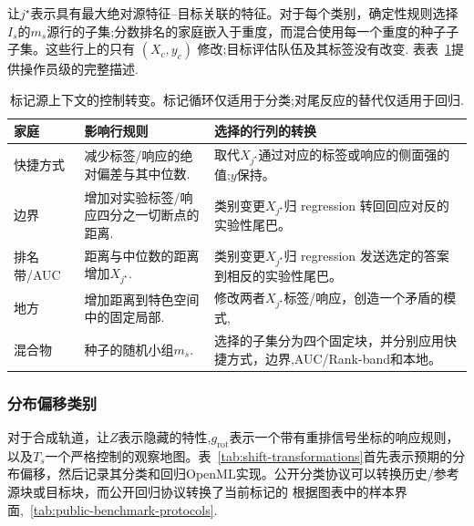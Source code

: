 让$j^\star$表示具有最大绝对源特征--目标关联的特征。对于每个类别，确定性规则选择 $I_s$的$m_s$源行的子集;分数排名的家庭嵌入于重度，而混合使用每一个重度的种子子子集。这些行上的只有 $(X_c,y_c)$ 修改;目标评估队伍及其标签没有改变.
表表~\ref{tab:context-perturbation-transformations}提供操作员级的完整描述.

\begin{table}[H]
  \caption{标记源上下文的控制转变。标记循环仅适用于分类;对尾反应的替代仅适用于回归.}
  \label{tab:context-perturbation-transformations}
  \centering
  \footnotesize
  \setlength{\tabcolsep}{3pt}
  \begin{tabular}{@{}>{\raggedright\arraybackslash}p{} >{\raggedright\arraybackslash}p{} >{\raggedright\arraybackslash}p{}@{}}
    \toprule 家庭&影响行规则&选择的行列的转换\\
    \midrule 快捷方式&减少标签/响应的绝对偏差与其中位数.&取代$X_{j^\star}$通过对应的标签或响应的侧面强的值;$y$保持。\\
边界&增加对实验标签/响应四分之一切断点的距离.&类别变更$X_{j^\star}$归 regression 转回回应对反的实验性尾巴。\\
排名带/AUC&距离与中位数的距离增加$X_{j^\star}$.
      &类别变更$X_{j^\star}$归 regression 发送选定的答案到相反的实验性尾巴。\\
地方&增加距离到特色空间中的固定局部.&修改两者$X_{j^\star}$标签/响应，创造一个矛盾的模式,\\
混合物&种子的随机小组$m_s$.
      &选择的子集分为四个固定块，并分别应用快捷方式，边界,AUC/Rank-band和本地。\\
    \bottomrule
  \end{tabular}
\end{table}

\subsubsection{分布偏移类别}

对于合成轨道，让$Z$表示隐藏的特性,$g_{\mathrm{rot}}$表示一个带有重排信号坐标的响应规则，以及$T_s$一个严格控制的观察地图。表~\ref{tab:shift-transformations}首先表示预期的分布偏移，然后记录其分类和回归OpenML实现。公开分类协议可以转换历史/参考源块或目标块，而公开回归协议转换了当前标记的
根据图表中的样本界面,~\ref{tab:public-benchmark-protocols}.

